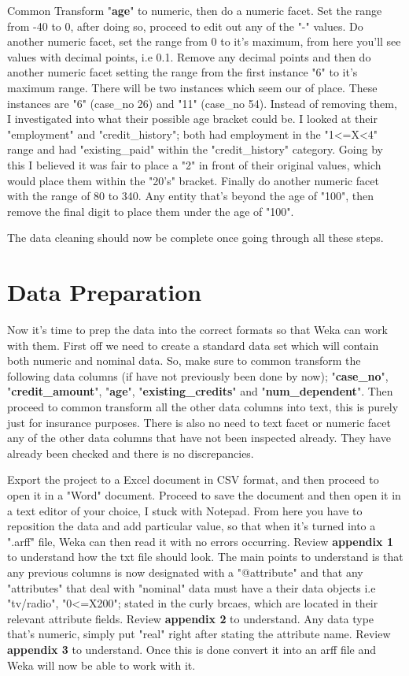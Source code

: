 \documentclass[12pt, a4paper]{article}
\begin{document}
    Common Transform "\textbf{age}" to numeric, then do a numeric facet. Set the range from -40 to 0, after doing so, proceed to edit out any of the "-" values. Do another numeric facet, set the range from 0 to it's maximum, from here you'll see values with decimal points, i.e 0.1. Remove any decimal points and then do another numeric facet setting the range from the first instance "6" to it's maximum range. There will be two instances which seem our of place. These instances are "6" (case\_no 26) and "11" (case\_no 54). Instead of removing them, I investigated into what their possible age bracket could be. I looked at their "employment" and "credit\_history"; both had employment in the "1<=X<4" range and had "existing\_paid" within the "credit\_history" category. Going by this I believed it was fair to place a "2" in front of their original values, which would place them within the "20's" bracket. Finally do another numeric facet with the range of  80 to 340. Any entity that's beyond the age of "100", then remove the final digit to place them under the age of "100".
    
    The data cleaning should now be complete once going through all these steps.
    
    \section{Data Preparation}
    Now it's time to prep the data into the correct formats so that Weka can work with them. First off we need to create a standard data set which will contain both numeric and nominal data. So, make sure to common transform the following data columns (if have not previously been done by now); "\textbf{case\_no}", "\textbf{credit\_amount}", "\textbf{age}", "\textbf{existing\_credits}" and "\textbf{num\_dependent}". Then proceed to common transform all the other data columns into text, this is purely just for insurance purposes. There is also no need to text facet or numeric facet any of the other data columns that have not been inspected already. They have already been checked and there is no discrepancies.
    
    Export the project to a Excel document in CSV format, and then proceed to open it in a "Word" document. Proceed to save the document and then open it in a text editor of your choice, I stuck with Notepad. From here you have to reposition the data and add particular value, so that when it's turned into a ".arff" file, Weka can then read it with no errors occurring. Review \textbf{appendix 1} to understand how the txt file should look. The main points to understand is that any previous columns is now designated with a "@attribute" and that any "attributes" that deal with "nominal" data must have a their data objects i.e "tv/radio", "0<=X200"; stated in the curly brcaes, which are located in their relevant attribute fields. Review \textbf{appendix 2} to understand. Any data type that's numeric, simply put "real" right after stating the attribute name. Review \textbf{appendix 3} to understand. Once this is done convert it into an arff file and Weka will now be able to work with it.
    
\end{document}
